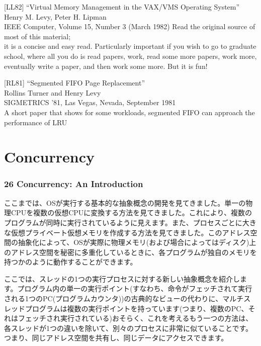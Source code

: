 {[}LL82{]} ``Virtual Memory Management in the VAX/VMS Operating
System''\\
Henry M. Levy, Peter H. Lipman\\
IEEE Computer, Volume 15, Number 3 (March 1982) Read the original source
of most of this material;\\
it is a concise and easy read. Particularly important if you wish to go
to graduate school, where all you do is read papers, work, read some
more papers, work more, eventually write a paper, and then work some
more. But it is fun!

{[}RL81{]} ``Segmented FIFO Page Replacement''\\
Rollins Turner and Henry Levy\\
SIGMETRICS '81, Las Vegas, Nevada, September 1981\\
A short paper that shows for some workloads, segmented FIFO can approach
the performance of LRU

\part{Concurrency}

\hypertarget{concurrency-an-introduction}{%
\section*{26 Concurrency: An
Introduction}\label{concurrency-an-introduction}}

ここまでは、OSが実行する基本的な抽象概念の開発を見てきました。単一の物理CPUを複数の仮想CPUに変換する方法を見てきました。これにより、複数のプログラムが同時に実行されているように見えます。また、プロセスごとに大きな仮想プライベート仮想メモリを作成する方法を見てきました。このアドレス空間の抽象化によって、OSが実際に物理メモリ(および場合によってはディスク)上のアドレス空間を秘密に多重化しているときに、各プログラムが独自のメモリを持つかのように動作することができます。

ここでは、スレッドの1つの実行プロセスに対する新しい抽象概念を紹介します。プログラム内の単一の実行ポイント(すなわち、命令がフェッチされて実行される1つのPC(プログラムカウンタ))の古典的なビューの代わりに、マルチスレッドプログラムは複数の実行ポイントを持っています(つまり、複数のPC、それはフェッチされ実行されている)おそらく、これを考えるもう一つの方法は、各スレッドが1つの違いを除いて、別々のプロセスに非常に似ていることです。つまり、同じアドレス空間を共有し、同じデータにアクセスできます。

